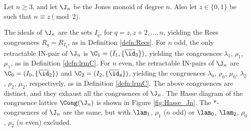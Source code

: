 \begin{thm}\label{thm:cong-Jn}
Let $n\geq3$, and let $\J_n$ be the Jones monoid of degree $n$.  Also let $z\in\{0,1\}$ be such that $n\equiv z\pmod{2}$.
\begin{itemize}
 The ideals of $\J_n$ are the sets $I_q$, for $q=z,z+2,\ldots,n$, yielding the Rees congruences $R_q=R_{I_q}$, as in Definition \ref{defn:Rees}.
 For $n$ odd, the only retractable IN-pair of $\J_n$ is $\C_1=(I_1,\{\overline\id_3\})$, yielding the congruences $\lambda_1$, $\rho_1$, $\mu_1$, as in Definition \ref{defn:lrmC}.
 For $n$ even, the retractable IN-pairs of $\J_n$ are $\C_0=(I_0,\{\overline{\id}_2\})$ and $\C_2=(I_2,\{\overline{\id}_4\})$, yielding the congruences $\lambda_0$, $\rho_0$, $\mu_0$, $\lambda_2$, $\rho_2$, $\mu_2$, respectively, as in Definition \ref{defn:lrmC}.  
 The above congruences are distinct, and they exhaust all the congruences of $\J_n$.
 The Hasse diagram of the congruence lattice $\Cong(\J_n) $ is shown in Figure \ref{fig:Hasse_Jn}.
 The $\ast$-congruences of $\J_n$ are the same, but with $\lam_1$, $\rho_1$ ($n$ odd) or $\lam_0$, $\lam_2$, $\rho_0$, $\rho_2$ ($n$ even) excluded.
\end{itemize}
\end{thm}










